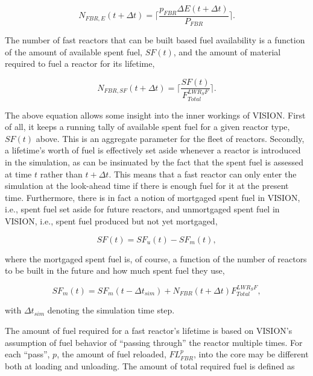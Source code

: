 \begin{equation}
N_{FBR,E}\left(t+\Delta t\right) = 
                        \lceil \frac{p_{FBR} \Delta E (t + \Delta t)}
                                    {P_{FBR}} \rceil .
\end{equation}

The number of fast reactors that can be built based fuel availability is a
function of the amount of available spent fuel, $SF(t)$, and the amount
of material required to fuel a reactor for its lifetime,

\begin{equation}
N_{FBR,SF}\left(t+\Delta t\right) = 
                        \lceil \frac{SF(t)}
                                    {F^{LWR_SF}_{Total}} \rceil .
\end{equation}

The above equation allows some insight into the inner workings of VISION. First
of all, it keeps a running tally of available spent fuel for a given reactor
type, $SF(t)$ above. This is an aggregate parameter for the fleet of
reactors. Secondly, a lifetime's worth of fuel is effectively set aside whenever
a reactor is introduced in the simulation, as can be insinuated by the fact that
the spent fuel is assessed at time $t$ rather than $t + \Delta t$. This means
that a fast reactor can only enter the simulation at the look-ahead time if there
is enough fuel for it at the present time. Furthermore, there is in fact a
notion of mortgaged spent fuel in VISION, i.e., spent fuel set aside for future
reactors, and unmortgaged spent fuel in VISION, i.e., spent fuel produced but
not yet mortgaged,

\begin{equation}
SF(t) = SF_u(t) - SF_m(t),
\end{equation}

where the mortgaged spent fuel is, of course, a function of the number of
reactors to be built in the future and how much spent fuel they use,

\begin{equation}
SF_m(t) = SF_m(t - \Delta t_{sim}) + N_{FBR}(t + \Delta t) F^{LWR_SF}_{Total},
\end{equation}

with $\Delta t_{sim}$ denoting the simulation time step.

The amount of fuel required for a fast reactor's lifetime is based on VISION's
assumption of fuel behavior of ``passing through'' the reactor multiple
times. For each ``pass'', $p$, the amount of fuel reloaded, $FL^p_{FBR}$, into
the core may be different both at loading and unloading. The amount of total
required fuel is defined as

